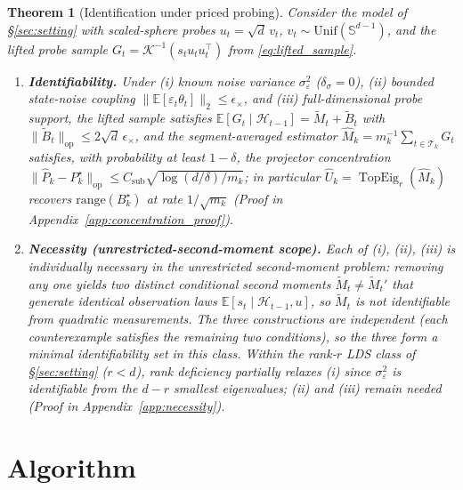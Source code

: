 \documentclass{article}
\newcommand{\E}{\mathbb{E}}
\newcommand{\op}{\mathrm{op}}
\newcommand{\cH}{\mathcal{H}}
\newcommand{\cT}{\mathcal{T}}
\newcommand{\range}{\mathrm{range}}
\DeclareMathOperator{\TopEig}{TopEig}
\newtheorem{theorem}{Theorem}
\begin{document}
\begin{theorem}[Identification under priced probing]
\label{thm:identification}
Consider the model of \S\ref{sec:setting} with scaled-sphere probes
$u_t=\sqrt d\,v_t$, $v_t\sim\mathrm{Unif}(\mathbb S^{d-1})$, and the
lifted probe sample $G_t=\mathcal K^{-1}(s_t u_tu_t^\top)$ from
\eqref{eq:lifted_sample}.
\begin{enumerate}[leftmargin=1.5em,itemsep=2pt,topsep=2pt]
\item \textbf{Identifiability.} Under (i) known noise variance
$\sigma_\varepsilon^2$ ($\delta_\sigma=0$), (ii) bounded state-noise
coupling $\|\E[\varepsilon_t\theta_t]\|_2\le\epsilon_\times$, and
(iii) full-dimensional probe support, the lifted sample satisfies
$\E[G_t\mid\cH_{t-1}]=\widetilde M_t+\widetilde B_t$ with
$\|\widetilde B_t\|_{\op}\le 2\sqrt d\,\epsilon_\times$, and the
segment-averaged estimator
$\widehat M_k=m_k^{-1}\sum_{t\in\cT_k}G_t$ satisfies, with
probability at least $1-\delta$, the projector concentration
$\|\widehat P_k-P_k^\star\|_{\op}\le C_{\mathrm{sub}}\sqrt{\log(d/\delta)/m_k}$;
in particular $\widehat U_k=\TopEig_r(\widehat M_k)$ recovers
$\range(B_k^\star)$ at rate $1/\sqrt{m_k}$ (Proof in Appendix~\ref{app:concentration_proof}).
\item \textbf{Necessity (unrestricted-second-moment scope).} Each of
(i), (ii), (iii) is individually necessary in the unrestricted
second-moment problem: removing any one yields two distinct
conditional second moments $\widetilde M_t\ne\widetilde M_t'$ that
generate identical observation laws
$\E[s_t\mid\cH_{t-1},u]$, so $\widetilde M_t$ is not identifiable from
quadratic measurements. The three constructions are independent (each
counterexample satisfies the remaining two conditions), so the three
form a minimal identifiability set in this class. Within the rank-$r$
LDS class of \S\ref{sec:setting} ($r<d$), rank deficiency partially
relaxes (i) since $\sigma_\varepsilon^2$ is identifiable from the
$d-r$ smallest eigenvalues; (ii) and (iii) remain needed (Proof in Appendix~\ref{app:necessity}).
\end{enumerate}

\end{theorem}

\section{Algorithm}
\label{sec:algorithm}
\end{document}
